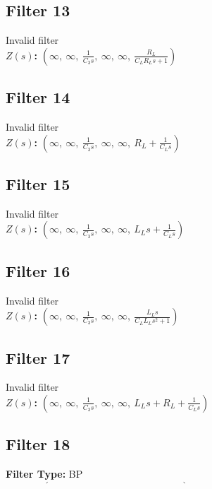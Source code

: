 \documentclass{article}
\begin{document}
\subsection*{Filter 13}
Invalid filter \\ 
\textbf{$Z(s)$:} $\left( \infty, \  \infty, \  \frac{1}{C_{3} s}, \  \infty, \  \infty, \  \frac{R_{L}}{C_{L} R_{L} s + 1}\right)$ \\ 
\subsection*{Filter 14}
Invalid filter \\ 
\textbf{$Z(s)$:} $\left( \infty, \  \infty, \  \frac{1}{C_{3} s}, \  \infty, \  \infty, \  R_{L} + \frac{1}{C_{L} s}\right)$ \\ 
\subsection*{Filter 15}
Invalid filter \\ 
\textbf{$Z(s)$:} $\left( \infty, \  \infty, \  \frac{1}{C_{3} s}, \  \infty, \  \infty, \  L_{L} s + \frac{1}{C_{L} s}\right)$ \\ 
\subsection*{Filter 16}
Invalid filter \\ 
\textbf{$Z(s)$:} $\left( \infty, \  \infty, \  \frac{1}{C_{3} s}, \  \infty, \  \infty, \  \frac{L_{L} s}{C_{L} L_{L} s^{2} + 1}\right)$ \\ 
\subsection*{Filter 17}
Invalid filter \\ 
\textbf{$Z(s)$:} $\left( \infty, \  \infty, \  \frac{1}{C_{3} s}, \  \infty, \  \infty, \  L_{L} s + R_{L} + \frac{1}{C_{L} s}\right)$ \\ 
\subsection*{Filter 18}
\textbf{Filter Type:} BP \\ 
\textbf{$Z(s)$:} $\left( \infty, \  \infty, \  \frac{1}{C_{3} s}, \  \infty, \  \infty, \  \frac{1}{C_{L} s + \frac{1}{R_{L}} + \frac{1}{L_{L} s}}\right)$ \\ 
\textbf{$H(s)$:} $\frac{L_{L} R_{L} s}{C_{3} L_{L} R_{L} s^{2} + C_{L} L_{L} R_{L} s^{2} + L_{L} s + R_{L}}$ \\ 
\textbf{Q:} $R_{L} \sqrt{\frac{1}{L_{L} \left(C_{3} + C_{L}\right)}} \left(C_{3} + C_{L}\right)$ \\ 
\textbf{$\omega_0$:} $\sqrt{\frac{1}{L_{L} \left(C_{3} + C_{L}\right)}}$ \\ 
\textbf{Bandwidth:} $\frac{1}{R_{L} \left(C_{3} + C_{L}\right)}$ \\ 
\end{document}
